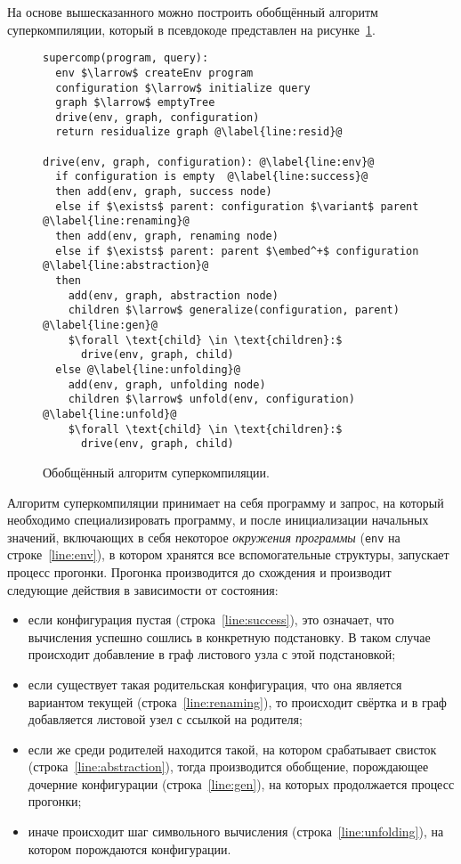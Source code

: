 
На основе вышесказанного можно построить обобщённый алгоритм суперкомпиляции,
который в псевдокоде представлен на рисунке~\ref{fig:scalgogen}.

\begin{figure}[h!]

\begin{lstlisting}[escapechar=@]
supercomp(program, query):
  env $\larrow$ createEnv program
  configuration $\larrow$ initialize query
  graph $\larrow$ emptyTree
  drive(env, graph, configuration)
  return residualize graph @\label{line:resid}@

drive(env, graph, configuration): @\label{line:env}@
  if configuration is empty  @\label{line:success}@
  then add(env, graph, success node)
  else if $\exists$ parent: configuration $\variant$ parent @\label{line:renaming}@
  then add(env, graph, renaming node)
  else if $\exists$ parent: parent $\embed^+$ configuration @\label{line:abstraction}@
  then
    add(env, graph, abstraction node)
    children $\larrow$ generalize(configuration, parent) @\label{line:gen}@
    $\forall \text{child} \in \text{children}:$
      drive(env, graph, child)
  else @\label{line:unfolding}@
    add(env, graph, unfolding node)
    children $\larrow$ unfold(env, configuration) @\label{line:unfold}@
    $\forall \text{child} \in \text{children}:$
      drive(env, graph, child)
\end{lstlisting}
\caption{Обобщённый алгоритм суперкомпиляции.}
\label{fig:scalgogen}
\end{figure}

Алгоритм суперкомпиляции принимает на себя программу и запрос,
на который необходимо специализировать программу, и после
инициализации начальных значений, включающих в себя некоторое
\emph{окружения программы} (\lstinline{env} на строке~\ref{line:env}),
в котором хранятся все вспомогательные структуры, запускает процесс прогонки.
Прогонка производится до схождения и производит следующие действия в
зависимости от состояния:
\begin{itemize}
\item если конфигурация пустая (строка~\ref{line:success}), это означает, что вычисления
      успешно сошлись в конкретную подстановку. В таком случае происходит добавление
      в граф листового узла с этой подстановкой;
\item если существует такая родительская конфигурация, что она является вариантом текущей (строка~\ref{line:renaming}),
      то происходит свёртка и в граф добавляется листовой узел с ссылкой на родителя;
\item если же среди родителей находится такой, на котором срабатывает свисток (строка~\ref{line:abstraction}),
      тогда производится обобщение, порождающее дочерние конфигурации (строка~\ref{line:gen}),
      на которых продолжается процесс прогонки;
\item иначе происходит шаг символьного вычисления (строка~\ref{line:unfolding}), на котором
      порождаются конфигурации.

\end{itemize}

